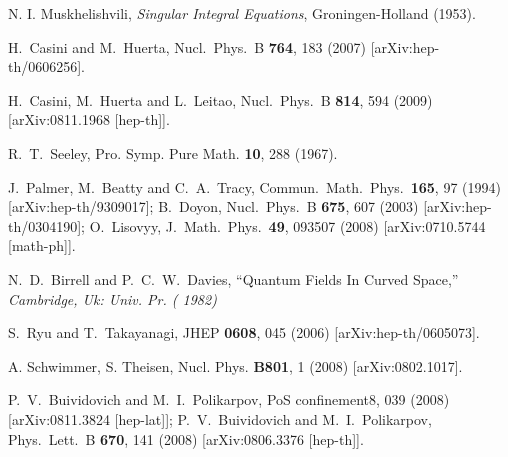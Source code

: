\documentclass[a4paper]{article}
\begin{document}
\begin{thebibliography}{99}
N. I. Muskhelishvili, {\sl Singular Integral Equations}, Groningen-Holland (1953).



  H.~Casini and M.~Huerta,
  Nucl.\ Phys.\  B {\bf 764}, 183 (2007)
  [arXiv:hep-th/0606256].



  H.~Casini, M.~Huerta and L.~Leitao,
  Nucl.\ Phys.\  B {\bf 814}, 594 (2009)
  [arXiv:0811.1968 [hep-th]].






R.~T.~Seeley, Pro. Symp. Pure Math.  {\bf 10}, 288 (1967).

  J.~Palmer, M.~Beatty and C.~A.~Tracy,
  Commun.\ Math.\ Phys.\  {\bf 165}, 97 (1994)
  [arXiv:hep-th/9309017];
  B.~Doyon,
  Nucl.\ Phys.\ B {\bf 675}, 607 (2003)
  [arXiv:hep-th/0304190];
   O.~Lisovyy,
  J.\ Math.\ Phys.\  {\bf 49}, 093507 (2008)
  [arXiv:0710.5744 [math-ph]].




  N.~D.~Birrell and P.~C.~W.~Davies,
  ``Quantum Fields In Curved Space,''
{\it  Cambridge, Uk: Univ. Pr. ( 1982) }

  S.~Ryu and T.~Takayanagi,
  JHEP {\bf 0608}, 045 (2006)
  [arXiv:hep-th/0605073].

A. Schwimmer, S. Theisen, Nucl. Phys. {\bf B801}, 1 (2008) [arXiv:0802.1017]. 

  P.~V.~Buividovich and M.~I.~Polikarpov,
  PoS  confinement8, 039 (2008)
  [arXiv:0811.3824 [hep-lat]]; 
  P.~V.~Buividovich and M.~I.~Polikarpov,
  Phys.\ Lett.\  B {\bf 670}, 141 (2008)
  [arXiv:0806.3376 [hep-th]].




\end{thebibliography}    
\end{document}
